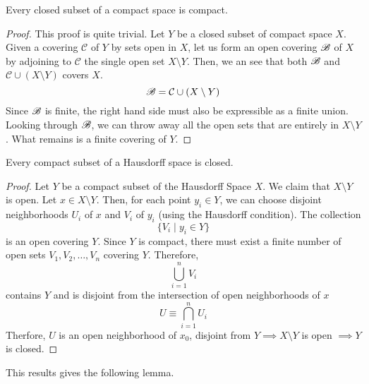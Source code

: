   \begin{theorem}
    Every closed subset of a compact space is compact. 
  \end{theorem}
  \begin{proof}
    This proof is quite trivial. Let $Y$ be a closed subset of compact space $X$. Given a covering $\mathcal{C}$ of $Y$ by sets open in $X$, let us form an open covering $\operatorname{\mathscr{B}}$ of $X$ by adjoining to $\mathcal{C}$ the single open set $X \setminus Y$. Then, we an see that both $\operatorname{\mathscr{B}}$ and $\mathcal{C} \cup (X \setminus Y)$ covers $X$. 
    \begin{equation}
      \operatorname{\mathscr{B}} = \mathcal{C} \cup (X \setminus Y)
    \end{equation}
    Since $\operatorname{\mathscr{B}}$ is finite, the right hand side must also be expressible as a finite union. Looking through $\operatorname{\mathscr{B}}$, we can throw away all the open sets that are entirely in $X \setminus Y$. What remains is a finite covering of $Y$. 
  \end{proof}

  \begin{theorem}
    Every compact subset of a Hausdorff space is closed. 
  \end{theorem}
  \begin{proof}
    Let $Y$ be a compact subset of the Hausdorff Space $X$. We claim that $X \setminus Y$ is open. Let $x \in X \setminus Y$. Then, for each point $y_i \in Y$, we can choose disjoint neighborhoods $U_i$ of $x$ and $V_i$ of $y_i$ (using the Hausdorff condition). The collection 
    \begin{equation}
      \{V_i \; | \; y_i \in Y\}
    \end{equation}
    is an open covering $Y$. Since $Y$ is compact, there must exist a finite number of open sets $V_1, V_2, \ldots , V_n$ covering $Y$. Therefore, 
    \begin{equation}
      \bigcup_{i=1}^n V_i
    \end{equation}
    contains $Y$ and is disjoint from the intersection of open neighborhoods of $x$
    \begin{equation}
      U \equiv \bigcap_{i=1}^n U_i
    \end{equation}
    Therfore, $U$ is an open neighborhood of $x_0$, disjoint from $Y \implies X \setminus Y$ is open $\implies Y$ is closed.
  \end{proof}

  This results gives the following lemma. 

